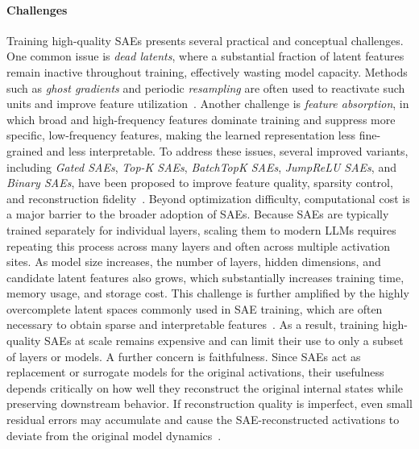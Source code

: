 \documentclass[11pt,letterpaper]{mystyle}
\begin{document}
\paragraph{Challenges}
Training high-quality SAEs presents several practical and conceptual challenges. One common issue is \textit{dead latents}, where a substantial fraction of latent features remain inactive throughout training, effectively wasting model capacity. Methods such as \textit{ghost gradients} and periodic \textit{resampling} are often used to reactivate such units and improve feature utilization~\citep{bricken2023monosemanticity,shu-etal-2025-survey}. Another challenge is \textit{feature absorption}, in which broad and high-frequency features dominate training and suppress more specific, low-frequency features, making the learned representation less fine-grained and less interpretable. To address these issues, several improved variants, including \textit{Gated SAEs}, \textit{Top-K SAEs}, \textit{BatchTopK SAEs}, \textit{JumpReLU SAEs}, and \textit{Binary SAEs}, have been proposed to improve feature quality, sparsity control, and reconstruction fidelity~\citep{gao2024scaling,rajamanoharan2024improving,bussmann2024batchtopk,rajamanoharan2024jumping,cho2025binary}.
Beyond optimization difficulty, computational cost is a major barrier to the broader adoption of SAEs. Because SAEs are typically trained separately for individual layers, scaling them to modern LLMs requires repeating this process across many layers and often across multiple activation sites. As model size increases, the number of layers, hidden dimensions, and candidate latent features also grows, which substantially increases training time, memory usage, and storage cost. This challenge is further amplified by the highly overcomplete latent spaces commonly used in SAE training, which are often necessary to obtain sparse and interpretable features~\citep{ghilardi2024efficient,templeton2024scaling,mudide2024efficient}. As a result, training high-quality SAEs at scale remains expensive and can limit their use to only a subset of layers or models.
A further concern is faithfulness. Since SAEs act as replacement or surrogate models for the original activations, their usefulness depends critically on how well they reconstruct the original internal states while preserving downstream behavior. If reconstruction quality is imperfect, even small residual errors may accumulate and cause the SAE-reconstructed activations to deviate from the original model dynamics~\citep{lieberum-etal-2024-gemma,he2024llama}. 
\end{document}
